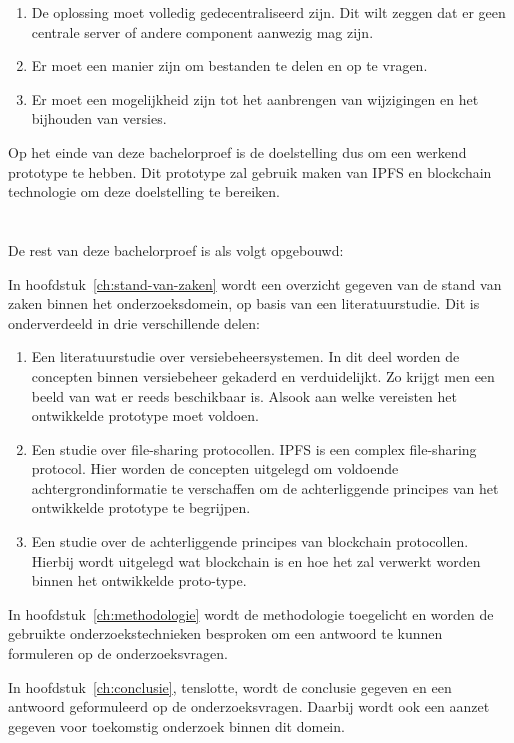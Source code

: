 \begin{enumerate}
 \item De oplossing moet volledig gedecentraliseerd zijn. Dit wilt zeggen dat er geen centrale server of andere component aanwezig mag zijn.\\
 \item Er moet een manier zijn om bestanden te delen en op te vragen.\\
 \item Er moet een mogelijkheid zijn tot het aanbrengen van wijzigingen en het bijhouden van versies.
\end{enumerate}

Op het einde van deze bachelorproef is de doelstelling dus om een werkend prototype te hebben. Dit prototype zal gebruik maken van IPFS en blockchain technologie om deze doelstelling te bereiken.

\section{}
\label{sec:opzet-bachelorproef}

De rest van deze bachelorproef is als volgt opgebouwd:

In hoofdstuk~\ref{ch:stand-van-zaken} wordt een overzicht gegeven van de stand van zaken binnen het onderzoeksdomein, op basis van een literatuurstudie. Dit is onderverdeeld in drie verschillende delen:

\begin{enumerate}
\item Een literatuurstudie over versiebeheersystemen. In dit deel worden de  concepten binnen versiebeheer gekaderd en verduidelijkt. Zo krijgt men een beeld van wat er reeds beschikbaar is. Alsook aan welke vereisten het ontwikkelde prototype moet voldoen.\\
\item Een studie over file-sharing protocollen. IPFS is een complex file-sharing protocol. Hier worden de concepten uitgelegd om voldoende achtergrondinformatie te verschaffen om de achterliggende principes van het ontwikkelde prototype te begrijpen.\\
\item Een studie over de achterliggende principes van blockchain protocollen. Hierbij wordt uitgelegd wat blockchain is en hoe het zal verwerkt worden binnen het ontwikkelde proto-type.
\end{enumerate}

In hoofdstuk~\ref{ch:methodologie} wordt de methodologie toegelicht en worden de gebruikte onderzoekstechnieken besproken om een antwoord te kunnen formuleren op de onderzoeksvragen.

In hoofdstuk~\ref{ch:conclusie}, tenslotte, wordt de conclusie gegeven en een antwoord geformuleerd op de onderzoeksvragen. Daarbij wordt ook een aanzet gegeven voor toekomstig onderzoek binnen dit domein.